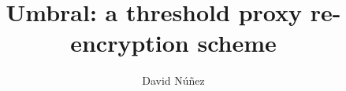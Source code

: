 \documentclass[12pt]{article}
\title{Umbral: a threshold proxy re-encryption scheme}
\author{David Núñez}
\date{} %
\begin{document}
\maketitle
\tableofcontents

\section{}
\subsection{}
\end{document}
